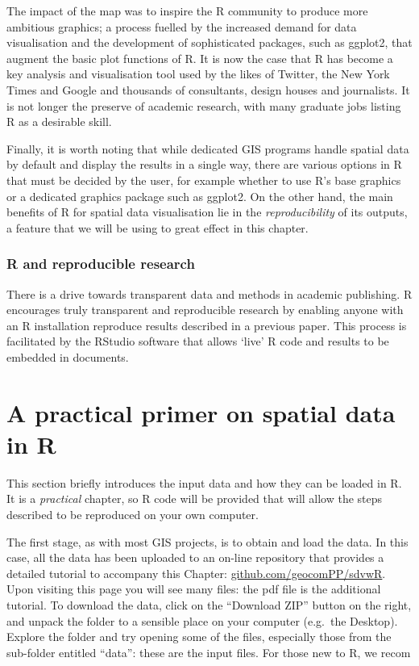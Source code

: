 \documentclass[]{article}
\begin{document}
The impact of the map was to inspire the R community to produce more
ambitious graphics; a process fuelled by the increased demand for data
visualisation and the development of sophisticated packages, such as
ggplot2, that augment the basic plot functions of R. It is now the case
that R has become a key analysis and visualisation tool used by the
likes of Twitter, the New York Times and Google and thousands of
consultants, design houses and journalists. It is not longer the
preserve of academic research, with many graduate jobs listing R as a
desirable skill.

Finally, it is worth noting that while dedicated GIS programs handle
spatial data by default and display the results in a single way, there
are various options in R that must be decided by the user, for example
whether to use R's base graphics or a dedicated graphics package such as
ggplot2. On the other hand, the main benefits of R for spatial data
visualisation lie in the \emph{reproducibility} of its outputs, a
feature that we will be using to great effect in this chapter.

\subsubsection{R and reproducible research}

There is a drive towards transparent data and methods in academic
publishing. R encourages truly transparent and reproducible research by
enabling anyone with an R installation reproduce results described in a
previous paper. This process is facilitated by the RStudio software that
allows `live' R code and results to be embedded in documents.

\section{A practical primer on spatial data in R}

This section briefly introduces the input data and how they can be
loaded in R. It is a \emph{practical} chapter, so R code will be
provided that will allow the steps described to be reproduced on your
own computer.

The first stage, as with most GIS projects, is to obtain and load the
data. In this case, all the data has been uploaded to an on-line
repository that provides a detailed tutorial to accompany this Chapter:
\href{https://github.com/geocomPP/sdvwR/blob/master/sdv-tutorial.pdf?raw=true}{github.com/geocomPP/sdvwR}.
Upon visiting this page you will see many files: the pdf file is the
additional tutorial. To download the data, click on the ``Download ZIP''
button on the right, and unpack the folder to a sensible place on your
computer (e.g.~the Desktop). Explore the folder and try opening some of
the files, especially those from the sub-folder entitled ``data'': these
are the input files. For those new to R, we recom
\end{document}
